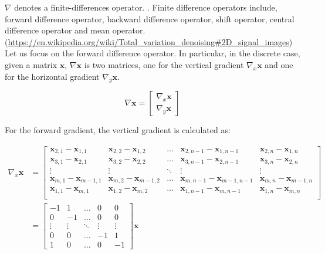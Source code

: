 \documentclass[12pt]{article}
\begin{document}
$\nabla$ denotes a finite-differences operator.
\cite{finite_difference_op}.
Finite difference operators include, forward difference operator,
backward difference operator, shift operator, central difference operator and mean operator.
(\url{https://en.wikipedia.org/wiki/Total_variation_denoising#2D_signal_images})
Let us focus on the forward difference operator. In particular, in the discrete case, given a matrix $\mathbf{x}$, $\nabla \mathbf{x}$ is two matrices, one for the vertical gradient $\nabla_{x} \mathbf{x}$ and one for the horizontal gradient $\nabla_{y} \mathbf{x}$.


\begin{equation}
  \nabla \mathbf{x} = \begin{bmatrix}
    \nabla_{x} \mathbf{x} \\
    \nabla_{y} \mathbf{x}
  \end{bmatrix}
\end{equation}



For the forward gradient, the vertical gradient is calculated as:

\begin{equation}
  \begin{align}
  \nabla_{x} \mathbf{x} &= \begin{bmatrix}
    \mathbf{x}_{2,1} - \mathbf{x}_{1,1} & \mathbf{x}_{2, 2} - \mathbf{x}_{1, 2} & \ldots & \mathbf{x}_{2, n-1} - \mathbf{x}_{1, n-1} & \mathbf{x}_{2, n} - \mathbf{x}_{1, n} \\
    \mathbf{x}_{3,1} - \mathbf{x}_{2,1} & \mathbf{x}_{3, 2} - \mathbf{x}_{2, 2} & \ldots & \mathbf{x}_{3, n-1} - \mathbf{x}_{2, n-1} & \mathbf{x}_{3, n} - \mathbf{x}_{2, n}  \\
    \vdots & \vdots & \ddots & \vdots & \vdots \\
    \mathbf{x}_{m,1} - \mathbf{x}_{m-1,1} & \mathbf{x}_{m, 2} - \mathbf{x}_{m-1, 2} & \ldots & \mathbf{x}_{m, n-1} - \mathbf{x}_{m-1, n-1} & \mathbf{x}_{m, n} - \mathbf{x}_{m-1, n} \\
    \mathbf{x}_{1, 1} - \mathbf{x}_{m, 1} & \mathbf{x}_{1, 2} - \mathbf{x}_{m, 2} & \ldots & \mathbf{x}_{1, n-1} - \mathbf{x}_{m, n-1} & \mathbf{x}_{1, n} - \mathbf{x}_{m, n} \\
  \end{bmatrix} \\
  &= \begin{bmatrix}
    -1 & 1 & \ldots & 0 & 0 \\
    0 & -1 & \ldots & 0 & 0 \\
     \vdots & \vdots & \ddots & \vdots & \vdots \\
    0 & 0 & \ldots & -1 & 1 \\
    1 & 0 & \ldots & 0 & -1
    \end{bmatrix} \mathbf{x}
  \end{align}
\end{equation}
\end{document}

